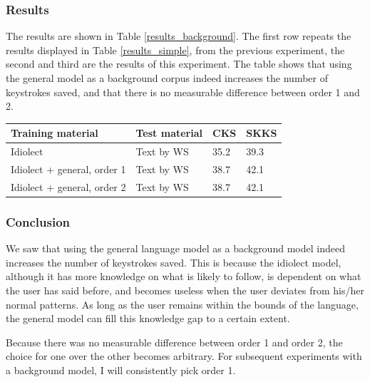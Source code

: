 \documentclass[11pt]{article}
\let\originaltable\table
\let\endoriginaltable\endtable
\renewenvironment{table}[1][ht]{%
  \originaltable[#1]
  \centering}%
  {\endoriginaltable}
\begin{document}
\subsubsection{Results}

The results are shown in Table \ref{results_background}. The first row repeats the results displayed in Table \ref{results_simple}, from the previous experiment, the second and third are the results of this experiment. The table shows that using the general model as a background corpus indeed increases the number of keystrokes saved, and that there is no measurable difference between order 1 and 2.

\begin{table}[H]
\begin{tabular}{ll|ll} 
Training material&Test material&CKS&SKKS\\
\hline
Idiolect&Text by WS&35.2&39.3\\
Idiolect + general, order 1&Text by WS&38.7&42.1\\
Idiolect + general, order 2&Text by WS&38.7&42.1\\
\end{tabular} 
\caption{Percentage of keystrokes that can be saved when using the general model as background model} \label{results_background}
\end{table}

\subsubsection{Conclusion}
We saw that using the general language model as a background model indeed increases the number of keystrokes saved. This is because the idiolect model, although it has more knowledge on what is likely to follow, is dependent on what the user has said before, and becomes useless when the user deviates from his/her normal patterns. As long as the user remains within the bounds of the language, the general model can fill this knowledge gap to a certain extent.

Because there was no measurable difference between order 1 and order 2, the choice for one over the other becomes arbitrary. For subsequent experiments with a background model, I will consistently pick order 1.
\end{document}
